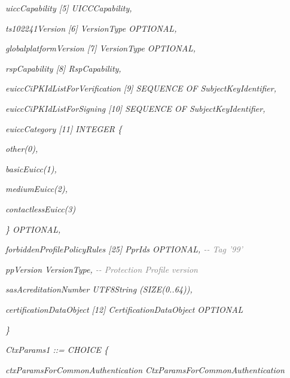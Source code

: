 \documentclass[10pt, oneside]{book}
\begin{document}
\hspace{0.75cm} \textit{uiccCapability [5] UICCCapability,}

\hspace{0.75cm} \textit{ts102241Version [6] VersionType OPTIONAL,}

\hspace{0.75cm} \textit{globalplatformVersion [7] VersionType OPTIONAL,}

\hspace{0.75cm} \textit{rspCapability [8] RspCapability,}

\hspace{0.75cm} \textit{euiccCiPKIdListForVerification [9] SEQUENCE OF SubjectKeyIdentifier,}

\hspace{0.75cm} \textit{euiccCiPKIdListForSigning [10] SEQUENCE OF SubjectKeyIdentifier,}

\hspace{0.75cm} \textit{euiccCategory [11] INTEGER \{}

\hspace{1.5cm} \textit{other(0),}

\hspace{1.5cm} \textit{basicEuicc(1),}

\hspace{1.5cm} \textit{mediumEuicc(2),}

\hspace{1.5cm} \textit{contactlessEuicc(3)}

\hspace{0.75cm} \textit{\} OPTIONAL,}

\hspace{0.75cm} \textit{forbiddenProfilePolicyRules [25] PprIds OPTIONAL, \textcolor{gray}{{-}{-} Tag '99'}}

\hspace{0.75cm} \textit{ppVersion VersionType, \textcolor{gray}{{-}{-} Protection Profile version}}

\hspace{0.75cm} \textit{sasAcreditationNumber UTF8String (SIZE(0..64)),}

\hspace{0.75cm} \textit{certificationDataObject [12] CertificationDataObject OPTIONAL}

\textit{\}\\}

\textit{CtxParams1 ::= CHOICE \{}

\hspace{0.75cm} \textit{ctxParamsForCommonAuthentication CtxParamsForCommonAuthentication}
\end{document}
